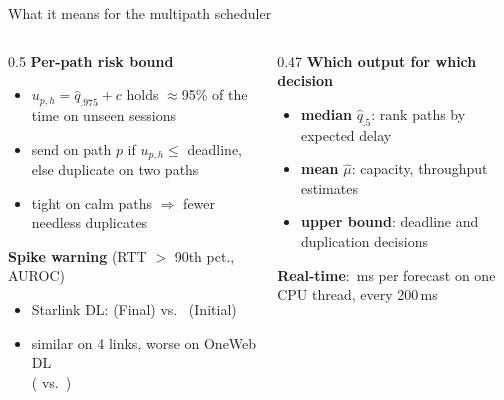 \documentclass[aspectratio=169,11pt]{beamer}
\newcommand{\good}[1]{\textcolor{Good}{\textbf{#1}}}
\begin{document}
\begin{frame}{What it means for the multipath scheduler}
  \begin{columns}[T,onlytextwidth]
  \begin{column}{0.5\textwidth}
  \textbf{Per-path risk bound}
  \begin{itemize}\small
    \item $u_{p,h}=\hat q_{.975}+c$ holds $\approx$95\% of the time on unseen sessions
    \item send on path $p$ if $u_{p,h}\le$ deadline, else duplicate on two paths
    \item tight on calm paths $\Rightarrow$ fewer needless duplicates
  \end{itemize}
  \textbf{Spike warning} (RTT $>$ 90th pct., AUROC)
  \begin{itemize}\small
    \item Starlink DL: \good{\AUCFRSLDL} (Final) vs.\ \AUCPrevSLDL{} (Initial)
    \item similar on 4 links, worse on OneWeb DL\\(\AUCFROWDL{} vs.\ \AUCPrevOWDL)
  \end{itemize}
  \end{column}
  \begin{column}{0.47\textwidth}
  \textbf{Which output for which decision}
  \begin{itemize}\small
    \item \textbf{median} $\hat q_{.5}$: rank paths by expected delay
    \item \textbf{mean} $\hat\mu$: capacity, throughput estimates
    \item \textbf{upper bound}: deadline and duplication decisions
  \end{itemize}
  \vspace{0.2cm}
  \textbf{Real-time}: \TimeDSCPU\,ms per forecast on one CPU thread, every 200\,ms
  \end{column}
  \end{columns}
\end{frame}
\end{document}
